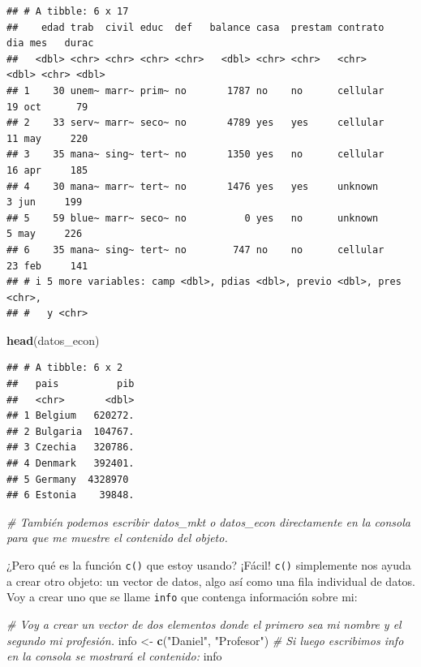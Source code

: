 \documentclass[
]{book}
\newenvironment{Shaded}{\begin{snugshade}}{\end{snugshade}}
\newcommand{\CommentTok}[1]{\textcolor[rgb]{0.56,0.35,0.01}{\textit{#1}}}
\newcommand{\FunctionTok}[1]{\textcolor[rgb]{0.13,0.29,0.53}{\textbf{#1}}}
\newcommand{\NormalTok}[1]{#1}
\newcommand{\OtherTok}[1]{\textcolor[rgb]{0.56,0.35,0.01}{#1}}
\newcommand{\StringTok}[1]{\textcolor[rgb]{0.31,0.60,0.02}{#1}}
\begin{document}
\begin{verbatim}
## # A tibble: 6 x 17
##    edad trab  civil educ  def   balance casa  prestam contrato   dia mes   durac
##   <dbl> <chr> <chr> <chr> <chr>   <dbl> <chr> <chr>   <chr>    <dbl> <chr> <dbl>
## 1    30 unem~ marr~ prim~ no       1787 no    no      cellular    19 oct      79
## 2    33 serv~ marr~ seco~ no       4789 yes   yes     cellular    11 may     220
## 3    35 mana~ sing~ tert~ no       1350 yes   no      cellular    16 apr     185
## 4    30 mana~ marr~ tert~ no       1476 yes   yes     unknown      3 jun     199
## 5    59 blue~ marr~ seco~ no          0 yes   no      unknown      5 may     226
## 6    35 mana~ sing~ tert~ no        747 no    no      cellular    23 feb     141
## # i 5 more variables: camp <dbl>, pdias <dbl>, previo <dbl>, pres <chr>,
## #   y <chr>
\end{verbatim}

\begin{Shaded}
\begin{Highlighting}[]
\FunctionTok{head}\NormalTok{(datos\_econ)}
\end{Highlighting}
\end{Shaded}

\begin{verbatim}
## # A tibble: 6 x 2
##   pais          pib
##   <chr>       <dbl>
## 1 Belgium   620272.
## 2 Bulgaria  104767.
## 3 Czechia   320786.
## 4 Denmark   392401.
## 5 Germany  4328970 
## 6 Estonia    39848.
\end{verbatim}

\begin{Shaded}
\begin{Highlighting}[]
\CommentTok{\# También podemos escribir \textquotesingle{}datos\_mkt\textquotesingle{} o \textquotesingle{}datos\_econ\textquotesingle{} directamente en la consola para que me muestre el contenido del objeto.}
\end{Highlighting}
\end{Shaded}

¿Pero qué es la función \texttt{c()} que estoy usando? ¡Fácil! \texttt{c()} simplemente nos ayuda a crear otro objeto: un vector de datos, algo así como una fila individual de datos. Voy a crear uno que se llame \texttt{info} que contenga información sobre mi:

\begin{Shaded}
\begin{Highlighting}[]
\CommentTok{\# Voy a crear un vector de dos elementos donde el primero sea mi nombre y el segundo mi profesión. }
\NormalTok{info }\OtherTok{\textless{}{-}} \FunctionTok{c}\NormalTok{(}\StringTok{"Daniel"}\NormalTok{, }\StringTok{"Profesor"}\NormalTok{)}
\CommentTok{\# Si luego escribimos \textquotesingle{}info\textquotesingle{} en la consola se mostrará el contenido: }
\NormalTok{info}
\end{Highlighting}
\end{Shaded}
\end{document}
